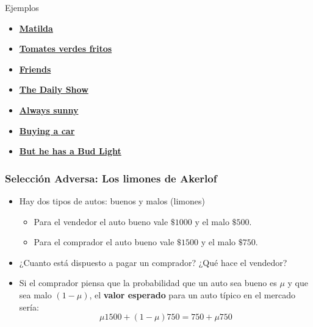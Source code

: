 \documentclass{beamer}
\begin{document}
\begin{frame}{Ejemplos}
    \begin{itemize}
    \item \href{https://www.youtube.com/watch?v=qlg0qakJhKU}{\textbf{Matilda}}
    \item \href{https://www.youtube.com/watch?v=akA8co61He4}{\textbf{Tomates verdes fritos}}
    \item \href{https://www.youtube.com/watch?v=X8BPfLhH6MA}{\textbf{Friends}}
    \item \href{https://videos.criticalcommons.org/media/encoded/16/jtierney86/43ba1b1ac3e94df3974f987cc912ae_Hxgbfl1.mp4}{\textbf{The Daily Show}}
    \item \href{http://videos.criticalcommons.org/transcoded/http/www.criticalcommons.org/Members/JJWooten/clips/always-sunny-paying-for-care/video_file/mp4-high/always-sunny-cost-of-care-mp4.mp4}{\textbf{Always sunny}}
    \item \href{https://www.youtube.com/watch?v=SrPu-xGrKrk}{\textbf{Buying a car}}
    \item \href{https://www.youtube.com/watch?v=ZZq0ShjEd-E}{\textbf{But he has a Bud Light}}
    \end{itemize}

\end{frame}
    


\begin{frame} \label{hdos}
\frametitle{Selección Adversa: Los limones de Akerlof}
    \begin{itemize}
        \item Hay dos tipos de autos: buenos y malos (limones)
        \begin{itemize}
            \item Para el vendedor el auto bueno vale $\$1000$ y el malo $\$500$.
            \item Para el comprador el auto bueno vale $\$1500$ y el malo $\$750$.
        \end{itemize}
        \item ¿Cuanto está dispuesto a pagar un comprador? ¿Qué hace el vendedor?
        \item Si el comprador piensa que la probabilidad que un auto sea bueno es $\mu$ y que sea malo  $(1-\mu)$, el \textbf{valor esperado} para un auto típico en el mercado sería:
        \[\mu 1500 + (1-\mu) 750= 750 + \mu 750\] 
    \end{itemize}

\end{frame}
\end{document}
